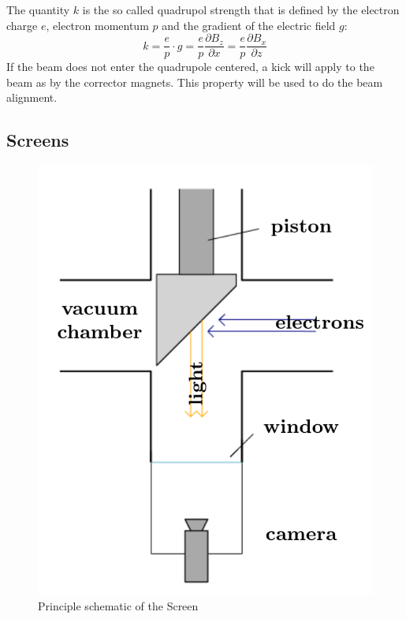 \documentclass[11pt,a4paper,notitlepage]{scrartcl}
\begin{document}
The quantity $k$ is the so called quadrupol strength that is defined by the electron charge $e$, electron momentum $p$ and the gradient of the electric field $g$:
$$k=\frac{e}{p}\cdot g = \frac{e}{p}\frac{\partial B_z}{\partial x}= \frac{e}{p}\frac{\partial B_x}{\partial z}$$
If the beam does not enter the quadrupole centered, a kick will apply to the beam as by the corrector magnets. This property will be used to do the beam alignment.


\subsection{Screens}

\begin{figure}
	\vspace{-2.5cm}
	\includegraphics[width=1\linewidth]{figs/screen.png}
	\caption{Principle schematic of the Screen \cite{script}}\label{fig:screens}
\end{figure}
\end{document}
